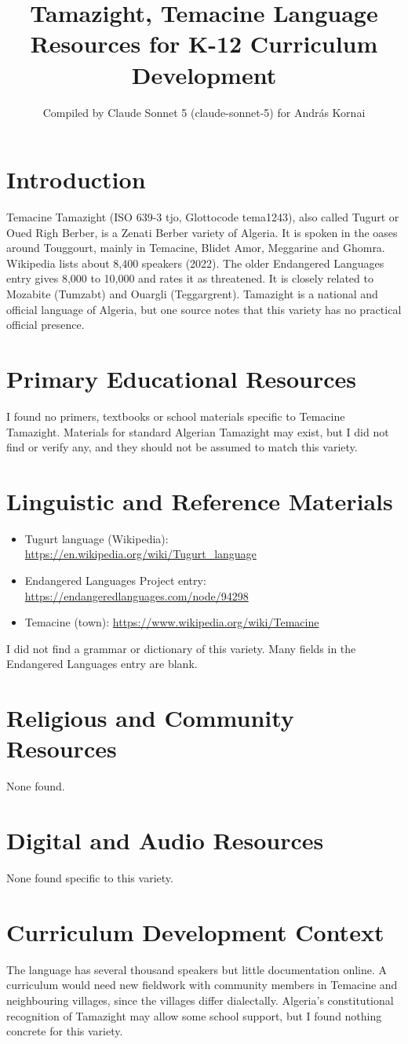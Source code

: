 \documentclass[12pt]{article}
\title{Tamazight, Temacine Language Resources for K-12 Curriculum Development}
\author{Compiled by Claude Sonnet 5 (claude-sonnet-5) for Andr\'as Kornai}
\date{}
\begin{document}
\maketitle

\section{Introduction}
Temacine Tamazight (ISO 639-3 tjo, Glottocode tema1243), also called Tugurt or Oued Righ Berber, is a Zenati Berber variety of Algeria. It is spoken in the oases around Touggourt, mainly in Temacine, Blidet Amor, Meggarine and Ghomra. Wikipedia lists about 8,400 speakers (2022). The older Endangered Languages entry gives 8,000 to 10,000 and rates it as threatened. It is closely related to Mozabite (Tumzabt) and Ouargli (Teggargrent). Tamazight is a national and official language of Algeria, but one source notes that this variety has no practical official presence.

\section{Primary Educational Resources}
I found no primers, textbooks or school materials specific to Temacine Tamazight. Materials for standard Algerian Tamazight may exist, but I did not find or verify any, and they should not be assumed to match this variety.

\section{Linguistic and Reference Materials}
\begin{itemize}
\item Tugurt language (Wikipedia): \url{https://en.wikipedia.org/wiki/Tugurt_language}
\item Endangered Languages Project entry: \url{https://endangeredlanguages.com/node/94298}
\item Temacine (town): \url{https://www.wikipedia.org/wiki/Temacine}
\end{itemize}
I did not find a grammar or dictionary of this variety. Many fields in the Endangered Languages entry are blank.

\section{Religious and Community Resources}
None found.

\section{Digital and Audio Resources}
None found specific to this variety.

\section{Curriculum Development Context}
The language has several thousand speakers but little documentation online. A curriculum would need new fieldwork with community members in Temacine and neighbouring villages, since the villages differ dialectally. Algeria's constitutional recognition of Tamazight may allow some school support, but I found nothing concrete for this variety.
\end{document}
